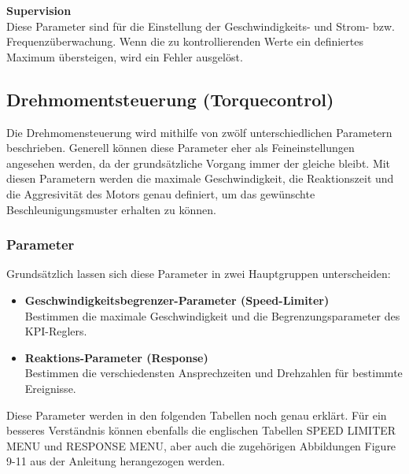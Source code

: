 \textbf{Supervision}\\[1mm]
Diese Parameter sind für die Einstellung der Geschwindigkeits- und Strom- bzw. Frequenzüberwachung. Wenn die zu kontrollierenden Werte ein definiertes Maximum übersteigen, wird ein Fehler ausgelöst.


\newpage

\subsection{Drehmomentsteuerung (Torquecontrol)}
Die Drehmomensteuerung wird mithilfe von zwölf unterschiedlichen Parametern beschrieben. Generell können diese Parameter eher als Feineinstellungen angesehen werden, da der grundsätzliche Vorgang immer der gleiche bleibt. Mit diesen Parametern werden die maximale Geschwindigkeit, die Reaktionszeit und die Aggresivität des Motors genau definiert, um das gewünschte Beschleunigungsmuster erhalten zu können.

\vspace{1mm}
 
\subsubsection{Parameter}
Grundsätzlich lassen sich diese Parameter in zwei Hauptgruppen unterscheiden:
\\[5mm]
\begin{itemize}
	\item \textbf{Geschwindigkeitsbegrenzer-Parameter (Speed-Limiter)}
	\\ \medskip Bestimmen die maximale Geschwindigkeit und die Begrenzungsparameter des KPI-Reglers.
	\medskip
	\item \textbf{Reaktions-Parameter (Response)}
	\\ \medskip Bestimmen die verschiedensten Ansprechzeiten und Drehzahlen für bestimmte Ereignisse.
\end{itemize}

\vspace{5mm}

Diese Parameter werden in den folgenden Tabellen noch genau erklärt. Für ein besseres Verständnis können ebenfalls die englischen Tabellen \glqq SPEED LIMITER MENU\grqq{} und \glqq RESPONSE MENU\grqq{}, aber auch die zugehörigen Abbildungen \glqq Figure 9-11\grqq{} aus der Anleitung herangezogen werden.




